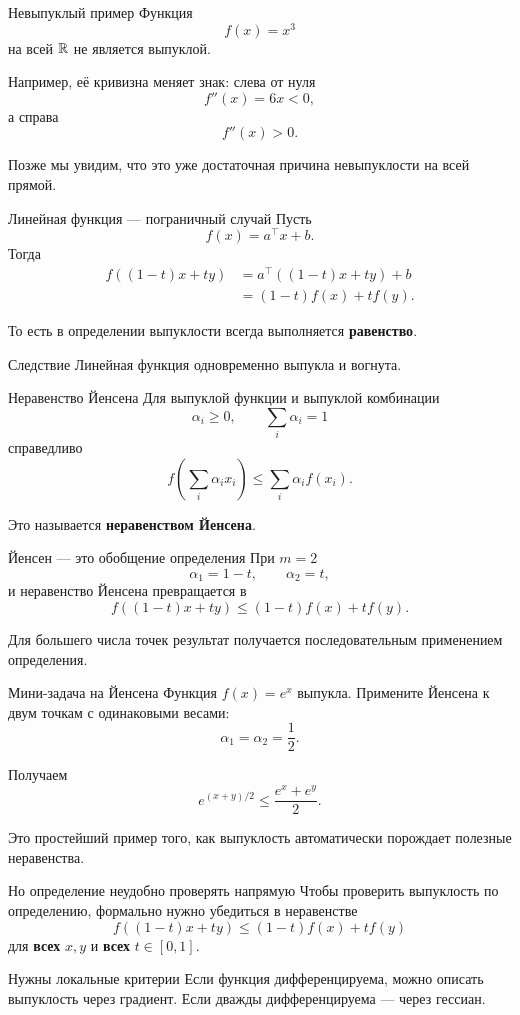 \begin{frame}{Невыпуклый пример}
\small
Функция
\[
 f(x)=x^3
\]
на всей $\mathbb{R}$ не является выпуклой.

Например, её кривизна меняет знак: слева от нуля
\[
 f''(x)=6x<0,
\]
а справа
\[
 f''(x)>0.
\]

Позже мы увидим, что это уже достаточная причина невыпуклости на всей прямой.
\end{frame}

\begin{frame}{Линейная функция — пограничный случай}
\small
Пусть
\[
 f(x)=a^\top x+b.
\]
Тогда
\[
\begin{aligned}
f((1-t)x+ty)
&=a^\top((1-t)x+ty)+b\\
&=(1-t)f(x)+tf(y).
\end{aligned}
\]

То есть в определении выпуклости всегда выполняется \textbf{равенство}.

\begin{block}{Следствие}
Линейная функция одновременно выпукла и вогнута.
\end{block}
\end{frame}

\begin{frame}{Неравенство Йенсена}
\small
Для выпуклой функции и выпуклой комбинации
\[
 \alpha_i\ge0,
 \qquad
 \sum_i\alpha_i=1
\]
справедливо
\[
\boxed{
 f\left(\sum_i\alpha_i x_i\right)
 \le
 \sum_i\alpha_i f(x_i).
}
\]

Это называется \textbf{неравенством Йенсена}.
\end{frame}

\begin{frame}{Йенсен — это обобщение определения}
\small
При $m=2$
\[
\alpha_1=1-t,
\qquad
\alpha_2=t,
\]
и неравенство Йенсена превращается в
\[
f((1-t)x+ty)
\le
(1-t)f(x)+tf(y).
\]

Для большего числа точек результат получается последовательным применением определения.
\end{frame}

\begin{frame}{Мини-задача на Йенсена}
\small
Функция $f(x)=e^x$ выпукла. Примените Йенсена к двум точкам с одинаковыми весами:
\[
\alpha_1=\alpha_2=\frac12.
\]

Получаем
\[
\boxed{
 e^{(x+y)/2}
 \le
 \frac{e^x+e^y}{2}.
}
\]

Это простейший пример того, как выпуклость автоматически порождает полезные неравенства.
\end{frame}

\begin{frame}{Но определение неудобно проверять напрямую}
\small
Чтобы проверить выпуклость по определению, формально нужно убедиться в неравенстве
\[
 f((1-t)x+ty)
 \le
 (1-t)f(x)+tf(y)
\]
для \textbf{всех} $x,y$ и \textbf{всех} $t\in[0,1]$.

\begin{alertblock}{Нужны локальные критерии}
Если функция дифференцируема, можно описать выпуклость через градиент. Если дважды дифференцируема --- через гессиан.
\end{alertblock}
\end{frame}
